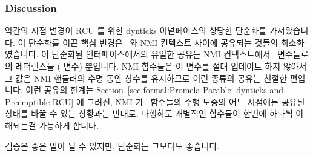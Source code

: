 \subsubsection{Discussion}
\label{sec:formal:Discussion}

약간의 시점 변경이 RCU 를 위한 dynticks 이넡페이스의 상당한 단순화를
가져왔습니다.
이 단순화를 이끈 핵심 변경은 \IRQ\ 와 NMI 컨텍스트 사이에 공유되는 것들의
최소화였습니다.
이 단순화된 인터페이스에서의 유일한 공유는 NMI 컨텍스트에서 \IRQ\ 변수들로의
레퍼런스들 ( 변수) 뿐입니다.
NMI 함수들은 이 변수를 절대 업데이트 하지 않아서 그 값은 NMI 핸들러의 수명 동안
상수를 유지하므로 이런 종류의 공유는 친절한 편입니다.
이런 공유의 한계는
Section~\ref{sec:formal:Promela Parable: dynticks and Preemptible RCU} 에
그려진, NMI 가 \IRQ\ 함수들의 수행 도중의 어느 시점에든 공유된 상태를 바꿀 수
있는 상황과는 반대로, 다행히도
개별적인 함수들이 한번에 하나씩 이해되는걸 가능하게 합니다.

검증은 좋은 일이 될 수 있지만, 단순화는 그보다도 좋습니다.
\iffalse

A slight shift in viewpoint resulted in a substantial simplification
of the dynticks interface for RCU.
The key change leading to this simplification was minimizing of
sharing between \IRQ\ and NMI contexts.
The only sharing in this simplified interface is references from NMI
context to \IRQ\ variables (the \co{dynticks} variable).
This type of sharing is benign, because the NMI functions never update
this variable, so that its value remains constant through the lifetime
of the NMI handler.
This limitation of sharing allows the individual functions to be
understood one at a time, in happy contrast to the situation
described in
Section~\ref{sec:formal:Promela Parable: dynticks and Preemptible RCU},
where an NMI might change shared state at any point during execution of
the \IRQ\ functions.

Verification can be a good thing, but simplicity is even better.
\fi
